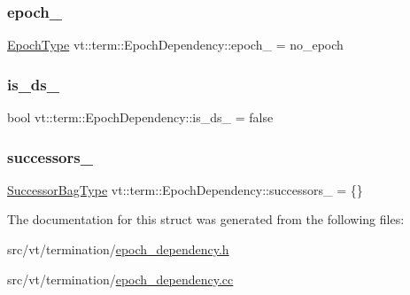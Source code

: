 \subsubsection{\texorpdfstring{epoch\+\_\+}{epoch\_}}
{\footnotesize\ttfamily \hyperlink{namespacevt_a985a5adf291c34a3ca263b3378388236}{Epoch\+Type} vt\+::term\+::\+Epoch\+Dependency\+::epoch\+\_\+ = no\+\_\+epoch\hspace{0.3cm}{\ttfamily [protected]}}

\mbox{\label{structvt_1_1term_1_1_epoch_dependency_af0e5729c264094d1bbc132f429a1219b}} 
\subsubsection{\texorpdfstring{is\+\_\+ds\+\_\+}{is\_ds\_}}
{\footnotesize\ttfamily bool vt\+::term\+::\+Epoch\+Dependency\+::is\+\_\+ds\+\_\+ = false\hspace{0.3cm}{\ttfamily [private]}}

\mbox{\label{structvt_1_1term_1_1_epoch_dependency_ac9061b05e0c17f67b01754c4c1599770}} 
\subsubsection{\texorpdfstring{successors\+\_\+}{successors\_}}
{\footnotesize\ttfamily \hyperlink{structvt_1_1term_1_1_epoch_dependency_a3f00b47c33158f3241ebbeb0a0cb7b1d}{Successor\+Bag\+Type} vt\+::term\+::\+Epoch\+Dependency\+::successors\+\_\+ = \{\}\hspace{0.3cm}{\ttfamily [private]}}



The documentation for this struct was generated from the following files\+:\begin{DoxyCompactItemize}
\item 
src/vt/termination/\hyperlink{epoch__dependency_8h}{epoch\+\_\+dependency.\+h}\item 
src/vt/termination/\hyperlink{epoch__dependency_8cc}{epoch\+\_\+dependency.\+cc}\end{DoxyCompactItemize}
